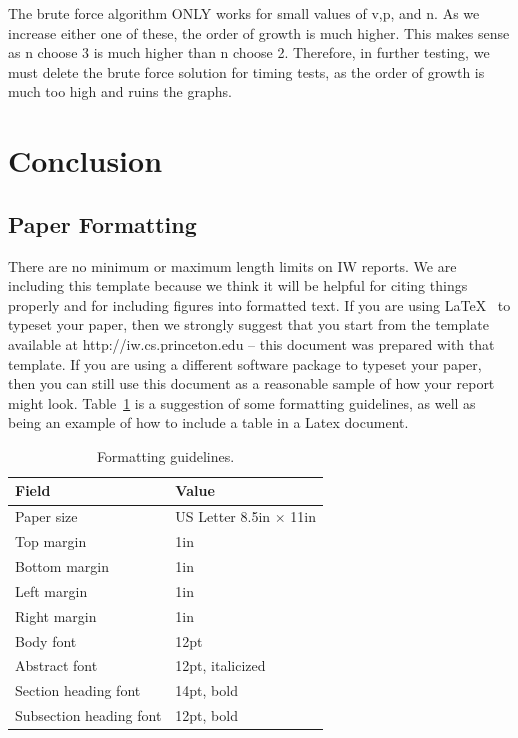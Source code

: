 \documentclass[pageno]{jpaper}
\begin{document}
The brute force algorithm ONLY works for small values of v,p, and n. As we increase either one of these, the order of growth is much higher. This makes sense as n choose 3 is much higher than n choose 2. Therefore, in further testing, we must delete the brute force solution for timing tests, as the order of growth is much too high and ruins the graphs. 

\section{Conclusion}










\subsection{Paper Formatting}
\label{section:formatting}

There are no minimum or maximum length limits on IW reports.  
We are including this template because we think it will be helpful
for citing things properly and for including figures into formatted
text.  If you are using \LaTeX~\cite{lamport94} 
to typeset your paper, then we strongly suggest
that you start from the template available at
http://iw.cs.princeton.edu -- this
document was prepared with that template.  
If you are using a different software package to typeset your paper, 
then you can still use this document as a reasonable sample of 
how your report might look.  Table~\ref{table:formatting} is a suggestion
of some formatting guidelines, as well as being an example of how to
include a table in a Latex document.

\begin{table}[hbt]
  \centering
  \begin{tabular}{|l|l|}
    \hline
    \textbf{Field} & \textbf{Value}\\
    \hline
    \hline
    Paper size & US Letter 8.5in $\times$ 11in\\
    \hline
    Top margin & 1in\\
    \hline
    Bottom margin & 1in\\
    \hline
    Left margin & 1in\\
    \hline
    Right margin & 1in\\
    \hline
    Body font & 12pt\\
    \hline
    Abstract font & 12pt, italicized\\
    \hline
    Section heading font & 14pt, bold\\
    \hline
    Subsection heading font & 12pt, bold\\
    \hline
  \end{tabular}
  \caption{Formatting guidelines. }
  \label{table:formatting}
\end{table}
\end{document}
